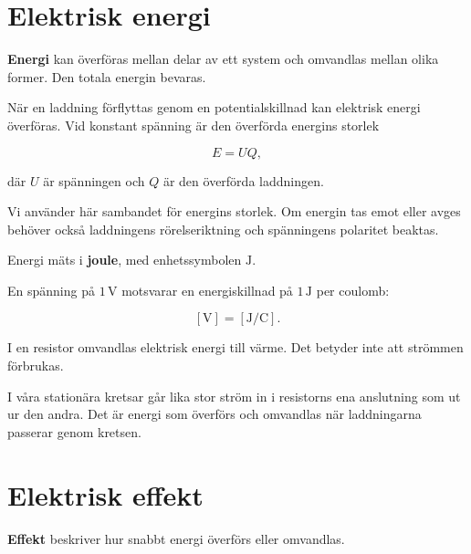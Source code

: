 \documentclass[
  swedish,
  11pt,
  a4paper,
  DIV=11,
  numbers=noendperiod,
  twoside,
  open=any]{scrreprt}
\begin{document}
\section{Elektrisk energi}\label{sec-effekt-elektrisk-energi}

\textbf{Energi} kan överföras mellan delar av ett system och omvandlas
mellan olika former. Den totala energin bevaras.

När en laddning förflyttas genom en potentialskillnad kan elektrisk
energi överföras. Vid konstant spänning är den överförda energins
storlek

\[
E = UQ,
\]

där \(U\) är spänningen och \(Q\) är den överförda laddningen.

Vi använder här sambandet för energins storlek. Om energin tas emot
eller avges behöver också laddningens rörelseriktning och spänningens
polaritet beaktas.

Energi mäts i \textbf{joule}, med enhetssymbolen \(\mathrm{J}\).

En spänning på \(1\,\mathrm{V}\) motsvarar en energiskillnad på
\(1\,\mathrm{J}\) per coulomb:

\[
[\mathrm{V}] = [\mathrm{J/C}].
\]

\begin{tcolorbox}[enhanced jigsaw, arc=.35mm, bottomrule=.15mm, bottomtitle=1mm, breakable, colback=white, colbacktitle=quarto-callout-important-color!10!white, colframe=quarto-callout-important-color-frame, coltitle=black, left=2mm, leftrule=.75mm, opacityback=0, opacitybacktitle=0.6, rightrule=.15mm, title=\textcolor{quarto-callout-important-color}{\faExclamation}\hspace{0.5em}{Energi omvandlas -- ström förbrukas inte}, titlerule=0mm, toprule=.15mm, toptitle=1mm]

I en resistor omvandlas elektrisk energi till värme. Det betyder inte
att strömmen förbrukas.

I våra stationära kretsar går lika stor ström in i resistorns ena
anslutning som ut ur den andra. Det är energi som överförs och omvandlas
när laddningarna passerar genom kretsen.

\end{tcolorbox}

\section{Elektrisk effekt}\label{sec-effekt-elektrisk-effekt}

\textbf{Effekt} beskriver hur snabbt energi överförs eller omvandlas.
\end{document}
